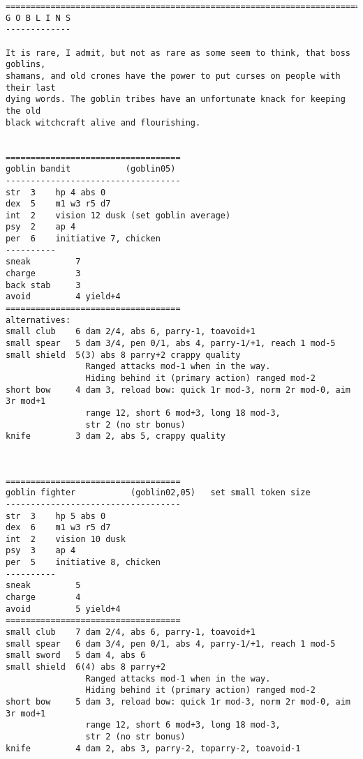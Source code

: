 \clearpage
{}


\goodbreak \begin{samepage} \small \begin{verbatim}
================================================================================
G O B L I N S
-------------

It is rare, I admit, but not as rare as some seem to think, that boss goblins,
shamans, and old crones have the power to put curses on people with their last
dying words. The goblin tribes have an unfortunate knack for keeping the old
black witchcraft alive and flourishing.


===================================
goblin bandit           (goblin05)
-----------------------------------
str  3    hp 4 abs 0
dex  5    m1 w3 r5 d7
int  2    vision 12 dusk (set goblin average)
psy  2    ap 4
per  6    initiative 7, chicken
----------
sneak         7
charge        3
back stab     3
avoid         4 yield+4
===================================
alternatives:
small club    6 dam 2/4, abs 6, parry-1, toavoid+1
small spear   5 dam 3/4, pen 0/1, abs 4, parry-1/+1, reach 1 mod-5
small shield  5(3) abs 8 parry+2 crappy quality
                Ranged attacks mod-1 when in the way.
                Hiding behind it (primary action) ranged mod-2
short bow     4 dam 3, reload bow: quick 1r mod-3, norm 2r mod-0, aim 3r mod+1
                range 12, short 6 mod+3, long 18 mod-3,
                str 2 (no str bonus)
knife         3 dam 2, abs 5, crappy quality
\end{verbatim} \normalsize \end{samepage}

\

\goodbreak \begin{samepage} \small \begin{verbatim}
===================================
goblin fighter           (goblin02,05)   set small token size
-----------------------------------
str  3    hp 5 abs 0
dex  6    m1 w3 r5 d7
int  2    vision 10 dusk
psy  3    ap 4
per  5    initiative 8, chicken
----------
sneak         5
charge        4
avoid         5 yield+4
===================================
small club    7 dam 2/4, abs 6, parry-1, toavoid+1
small spear   6 dam 3/4, pen 0/1, abs 4, parry-1/+1, reach 1 mod-5
small sword   5 dam 4, abs 6
small shield  6(4) abs 8 parry+2
                Ranged attacks mod-1 when in the way.
                Hiding behind it (primary action) ranged mod-2
short bow     5 dam 3, reload bow: quick 1r mod-3, norm 2r mod-0, aim 3r mod+1
                range 12, short 6 mod+3, long 18 mod-3,
                str 2 (no str bonus)
knife         4 dam 2, abs 3, parry-2, toparry-2, toavoid-1
\end{verbatim} \normalsize \end{samepage}

